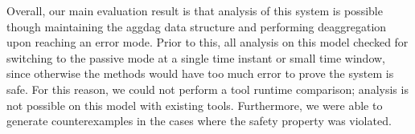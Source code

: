 Overall, our main evaluation result is that analysis of this system is possible though maintaining the aggdag data structure  and
performing deaggregation upon reaching an error mode.
%
Prior to this, all analysis on this model checked for switching to the passive mode at a single time instant or small time window, since otherwise the methods would have too much error to prove the system is safe.
%
For this reason, we could not perform a tool runtime comparison; analysis is not possible on this model with existing tools.
%
Furthermore, we were able to generate counterexamples in the cases where the safety property was violated.
